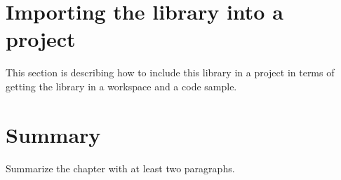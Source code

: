 \section{Importing the library into a project}
This section is describing how to include this library in a project in terms of getting the library in a workspace and a code sample.



\section{Summary}
Summarize the chapter with at least two paragraphs.




